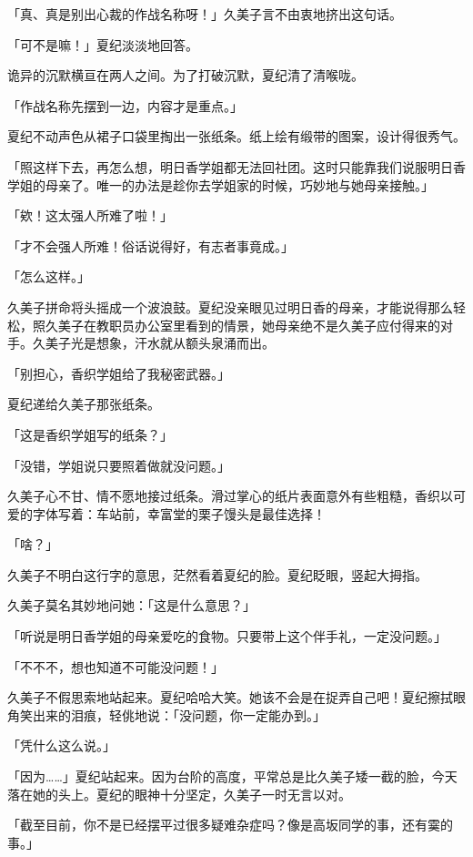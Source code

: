 \documentclass[UTF8]{ctexart}
\begin{document}
    「真、真是别出心裁的作战名称呀！」久美子言不由衷地挤出这句话。 

    「可不是嘛！」夏纪淡淡地回答。 

    诡异的沉默横亘在两人之间。为了打破沉默，夏纪清了清喉咙。 

    「作战名称先摆到一边，内容才是重点。」 

    夏纪不动声色从裙子口袋里掏出一张纸条。纸上绘有缎带的图案，设计得很秀气。 

    「照这样下去，再怎么想，明日香学姐都无法回社团。这时只能靠我们说服明日香学姐的母亲了。唯一的办法是趁你去学姐家的时候，巧妙地与她母亲接触。」 

    「欸！这太强人所难了啦！」 

    「才不会强人所难！俗话说得好，有志者事竟成。」 

    「怎么这样。」 

    久美子拼命将头摇成一个波浪鼓。夏纪没亲眼见过明日香的母亲，才能说得那么轻松，照久美子在教职员办公室里看到的情景，她母亲绝不是久美子应付得来的对手。久美子光是想象，汗水就从额头泉涌而出。 

    「别担心，香织学姐给了我秘密武器。」 

    夏纪递给久美子那张纸条。 

    「这是香织学姐写的纸条？」 

    「没错，学姐说只要照着做就没问题。」 

    久美子心不甘、情不愿地接过纸条。滑过掌心的纸片表面意外有些粗糙，香织以可爱的字体写着：车站前，幸富堂的栗子馒头是最佳选择！ 

    「啥？」 

    久美子不明白这行字的意思，茫然看着夏纪的脸。夏纪眨眼，竖起大拇指。 

    久美子莫名其妙地问她：「这是什么意思？」 

    「听说是明日香学姐的母亲爱吃的食物。只要带上这个伴手礼，一定没问题。」 

    「不不不，想也知道不可能没问题！」 

    久美子不假思索地站起来。夏纪哈哈大笑。她该不会是在捉弄自己吧！夏纪擦拭眼角笑出来的泪痕，轻佻地说：「没问题，你一定能办到。」 

    「凭什么这么说。」 

    「因为……」夏纪站起来。因为台阶的高度，平常总是比久美子矮一截的脸，今天落在她的头上。夏纪的眼神十分坚定，久美子一时无言以对。 

    「截至目前，你不是已经摆平过很多疑难杂症吗？像是高坂同学的事，还有霙的事。」 
\end{document}
